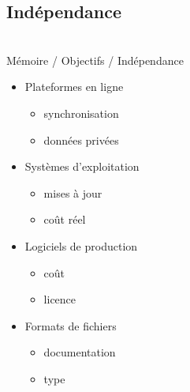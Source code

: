 \subsection{Indépendance}\begin{frame}
{\bititle\\Mémoire / Objectifs / Indépendance}
\begin{itemize}
\item<1-> Plateformes en ligne\begin{itemize}
    \item<2-> synchronisation
    \item<3-> données privées
    \end{itemize}
\item<4-> Systèmes d’exploitation\begin{itemize}
    \item<5-> mises à jour
    \item<6-> coût réel
    \end{itemize}
\item<7-> Logiciels de production\begin{itemize}
    \item<8-> coût
    \item<9-> licence
    \end{itemize}
\item<10-> Formats de fichiers\begin{itemize}
    \item<11-> documentation
    \item<12-> type
    \end{itemize}
\end{itemize}\end{frame}
